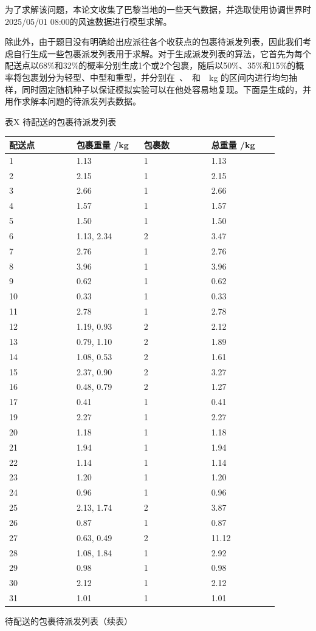 \documentclass[UTF8,fontset=windows,12pt,a4paper]{ctexart}
\begin{document}
为了求解该问题，本论文收集了巴黎当地的一些天气数据，并选取使用协调世界时2025/05/01 08:00的风速数据进行模型求解。

除此外，由于题目没有明确给出应派往各个收获点的包裹待派发列表，因此我们考虑自行生成一些包裹派发列表用于求解。对于生成派发列表的算法，它首先为每个配送点以68\%和32\%的概率分别生成1个或2个包裹，随后以50\%、35\%和15\%的概率将包裹划分为轻型、中型和重型，并分别在 、 和  kg 的区间内进行均匀抽样，同时固定随机种子以保证模拟实验可以在他处容易地复现。下面是生成的，并用作求解本问题的待派发列表数据。

\begin{center}{\small 表X 待配送的包裹待派发列表}\end{center}
\begin{center}\small
\begin{longtable}{p{0.22\linewidth}p{0.22\linewidth}p{0.22\linewidth}p{0.22\linewidth}}
\toprule
配送点 & 包裹重量 /kg & 包裹数 & 总重量 /kg \\
\midrule
1 & 1.13 & 1 & 1.13 \\
2 & 2.15 & 1 & 2.15 \\
3 & 2.66 & 1 & 2.66 \\
4 & 1.57 & 1 & 1.57 \\
5 & 1.50 & 1 & 1.50 \\
6 & 1.13, 2.34 & 2 & 3.47 \\
7 & 2.76 & 1 & 2.76 \\
8 & 3.96 & 1 & 3.96 \\
9 & 0.62 & 1 & 0.62 \\
10 & 0.33 & 1 & 0.33 \\
11 & 2.78 & 1 & 2.78 \\
12 & 1.19, 0.93 & 2 & 2.12 \\
13 & 0.79, 1.10 & 2 & 1.89 \\
14 & 1.08, 0.53 & 2 & 1.61 \\
15 & 2.37, 0.90 & 2 & 3.27 \\
16 & 0.48, 0.79 & 2 & 1.27 \\
17 & 0.41 & 1 & 0.41 \\
19 & 2.27 & 1 & 2.27 \\
20 & 1.18 & 1 & 1.18 \\
21 & 1.94 & 1 & 1.94 \\
22 & 1.14 & 1 & 1.14 \\
23 & 1.20 & 1 & 1.20 \\
24 & 0.96 & 1 & 0.96 \\
25 & 2.13, 1.74 & 2 & 3.87 \\
26 & 0.87 & 1 & 0.87 \\
27 & 0.63, 0.49 & 2 & 11.12 \\
28 & 1.08, 1.84 & 1 & 2.92 \\
29 & 0.98 & 1 & 0.98 \\
30 & 2.12 & 1 & 2.12 \\
31 & 1.01 & 1 & 1.01 \\
\bottomrule
\end{longtable}
\end{center}
待配送的包裹待派发列表（续表）
\end{document}
